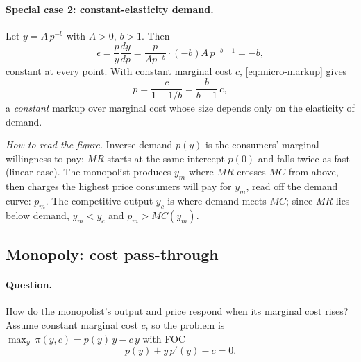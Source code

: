 \paragraph{Special case 2: constant-elasticity demand.} Let $y=A\,p^{-b}$ with $A>0$, $b>1$. Then
\[
\epsilon=\frac{p}{y}\frac{dy}{dp}=\frac{p}{Ap^{-b}}\cdot(-b)A\,p^{-b-1}=-b,
\]
constant at every point. With constant marginal cost $c$, \eqref{eq:micro-markup} gives
\[
p=\frac{c}{1-1/b}=\frac{b}{b-1}\,c,
\]
a \emph{constant} markup over marginal cost whose size depends only on the elasticity of demand.

\begin{center}
\end{center}
\textit{How to read the figure.} Inverse demand $p(y)$ is the consumers' marginal willingness to pay; $MR$ starts at the same intercept $p(0)$ and falls twice as fast (linear case). The monopolist produces $y_m$ where $MR$ crosses $MC$ from above, then charges the highest price consumers will pay for $y_m$, read off the demand curve: $p_m$. The competitive output $y_c$ is where demand meets $MC$; since $MR$ lies below demand, $y_m<y_c$ and $p_m>MC(y_m)$.

\subsection{Monopoly: cost pass-through }

\paragraph{Question.} How do the monopolist's output and price respond when its marginal cost rises? Assume constant marginal cost $c$, so the problem is $\max_y\ \pi(y,c)=p(y)\,y-c\,y$ with FOC
\begin{equation}\label{eq:micro-foc-c}
p(y)+y\,p'(y)-c=0 .
\end{equation}

